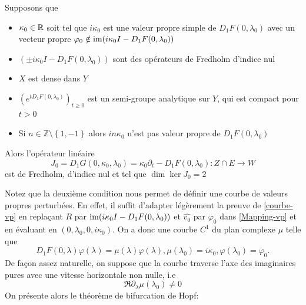 \documentclass[memoire.tex]{subfiles}
\begin{document}
    \begin{proposition}
        Supposons que
        \begin{itemize}
            \item $\kappa_0\in\mathbb{R}$ soit tel que $i\kappa_0$ est une valeur propre simple  de $D_1F(0,\lambda_0)$ avec un vecteur propre $\varphi_0\notin \operatorname{im}(i\kappa_0I -D_1F(0,\lambda_0)) $
            \item $(\pm i\kappa_0I -D_1F(0,\lambda_0))$ sont des opérateurs de Fredholm d'indice nul
            \item $X$ est dense dans $Y$
            \item $(e^{tD_1F(0,\lambda_0)})_{t\geq 0}$ est un semi-groupe analytique sur $Y$, qui est compact pour $t>0$
            \item Si $n\in\mathbb{Z}\setminus\left\{1,-1\right\}$ alors $in\kappa_0$ n'est pas valeur propre de $D_1F(0,\lambda_0)$
        \end{itemize}
        Alors l'opérateur linéaire
        \begin{equation*}
            J_0=D_1 G(0,\kappa_0,\lambda_0)=\kappa_0\partial_t -D_1F(0,\lambda_0): Z\cap E\rightarrow W
        \end{equation*}
        est de Fredholm, d'indice nul et tel que $\dim\ker J_0=2$
    \end{proposition}
    Notez que la deuxième condition nous permet de définir une courbe de valeurs propres perturbées. En effet, il suffit d'adapter légèrement la preuve de \ref{courbe-vp} en replaçant $R$ par $\operatorname{im}(i\kappa_0I -D_1F(0,\lambda_0))$ et $\hat{v_0}$ par $\varphi_0$ dans \eqref{Mapping-vp} et en évaluant en $(0,\lambda_0,0,i\kappa_0)$. On a donc une courbe $C^1$ du plan complexe $\mu$ telle que
    \begin{equation*}
        D_1F(0,\lambda)\varphi(\lambda)=\mu(\lambda)\varphi(\lambda),\mu(\lambda_0)=i\kappa_0, \varphi(\lambda_0)=\varphi_0.
    \end{equation*}
    De façon assez naturelle, on suppose que la courbe traverse l'axe des imaginaires pures avec une vitesse horizontale non nulle, i.e 
    \begin{equation*}
        \Re \partial_\lambda \mu(\lambda_0)\neq 0
    \end{equation*}
    On présente alors  le théorème de bifurcation de Hopf:
\end{document}
